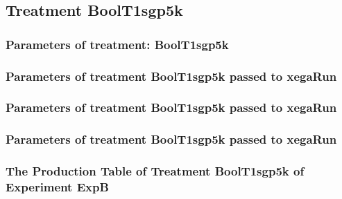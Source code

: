 \documentclass[18pt,c]{beamer}
\makeatletter
\def\beamer@writeslidentry@miniframesoff{%
  \expandafter\beamer@ifempty\expandafter{\beamer@framestartpage}{}%
  {%
   \clearpage\beamer@notesactions%
  }
}
\newcommand*{\miniframesoff}{\let\beamer@writeslidentry=\beamer@writeslidentry@miniframesoff}
\makeatother
\begin{document}
\miniframesoff
\subsection{Treatment BoolT1sgp5k}

 \begin{frame}
 \fontsize{8pt}{9pt}\selectfont
 \frametitle{  Parameters of treatment: BoolT1sgp5k 
 }

 \label{ExpBtParmTable032.tex}  
 \end{frame}


 \begin{frame}
 \fontsize{8pt}{9pt}\selectfont
 \frametitle{  Parameters of treatment BoolT1sgp5k passed to xegaRun
 }

 \label{ExpBtParmTable033.tex}  
 \end{frame}


 \begin{frame}
 \fontsize{8pt}{9pt}\selectfont
 \frametitle{  Parameters of treatment BoolT1sgp5k passed to xegaRun
 }

 \label{ExpBtParmTable034.tex}  
 \end{frame}


 \begin{frame}
 \fontsize{8pt}{9pt}\selectfont
 \frametitle{  Parameters of treatment BoolT1sgp5k passed to xegaRun
 }

 \label{ExpBtParmTable035.tex}  
 \end{frame}

 \begin{frame}
 \fontsize{8pt}{9pt}\selectfont
 \frametitle{ The Production Table of Treatment BoolT1sgp5k of Experiment ExpB }

 \label{ExpBGrammarTable008.tex}  
 \end{frame}
\end{document}

